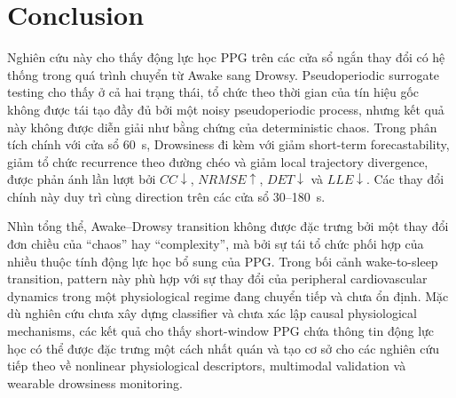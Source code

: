 \section{Conclusion}

Nghiên cứu này cho thấy động lực học PPG trên các cửa sổ ngắn thay đổi có hệ thống trong quá trình chuyển từ Awake sang Drowsy. Pseudoperiodic surrogate testing cho thấy ở cả hai trạng thái, tổ chức theo thời gian của tín hiệu gốc không được tái tạo đầy đủ bởi một noisy pseudoperiodic process, nhưng kết quả này không được diễn giải như bằng chứng của deterministic chaos. Trong phân tích chính với cửa sổ 60~s, Drowsiness đi kèm với giảm short-term forecastability, giảm tổ chức recurrence theo đường chéo và giảm local trajectory divergence, được phản ánh lần lượt bởi $CC\downarrow$, $NRMSE\uparrow$, $DET\downarrow$ và $LLE\downarrow$. Các thay đổi chính này duy trì cùng direction trên các cửa sổ 30--180~s.

Nhìn tổng thể, Awake--Drowsy transition không được đặc trưng bởi một thay đổi đơn chiều của ``chaos'' hay ``complexity'', mà bởi sự tái tổ chức phối hợp của nhiều thuộc tính động lực học bổ sung của PPG. Trong bối cảnh wake-to-sleep transition, pattern này phù hợp với sự thay đổi của peripheral cardiovascular dynamics trong một physiological regime đang chuyển tiếp và chưa ổn định. Mặc dù nghiên cứu chưa xây dựng classifier và chưa xác lập causal physiological mechanisms, các kết quả cho thấy short-window PPG chứa thông tin động lực học có thể được đặc trưng một cách nhất quán và tạo cơ sở cho các nghiên cứu tiếp theo về nonlinear physiological descriptors, multimodal validation và wearable drowsiness monitoring.